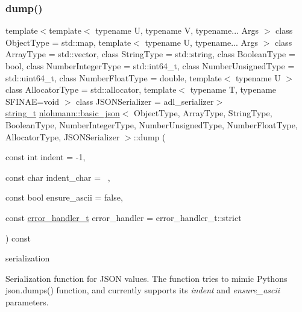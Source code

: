 \subsubsection{\texorpdfstring{dump()}{dump()}}
{\footnotesize\ttfamily template$<$template$<$ typename U, typename V, typename... Args $>$ class Object\+Type = std\+::map, template$<$ typename U, typename... Args $>$ class Array\+Type = std\+::vector, class String\+Type  = std\+::string, class Boolean\+Type  = bool, class Number\+Integer\+Type  = std\+::int64\+\_\+t, class Number\+Unsigned\+Type  = std\+::uint64\+\_\+t, class Number\+Float\+Type  = double, template$<$ typename U $>$ class Allocator\+Type = std\+::allocator, template$<$ typename T, typename S\+F\+I\+N\+A\+E=void $>$ class J\+S\+O\+N\+Serializer = adl\+\_\+serializer$>$ \\
\mbox{\hyperlink{classnlohmann_1_1basic__json_a61f8566a1a85a424c7266fb531dca005}{string\+\_\+t}} \mbox{\hyperlink{classnlohmann_1_1basic__json}{nlohmann\+::basic\+\_\+json}}$<$ Object\+Type, Array\+Type, String\+Type, Boolean\+Type, Number\+Integer\+Type, Number\+Unsigned\+Type, Number\+Float\+Type, Allocator\+Type, J\+S\+O\+N\+Serializer $>$\+::dump (\begin{DoxyParamCaption}\item[{const int}]{indent = {\ttfamily -\/1},  }\item[{const char}]{indent\+\_\+char = {\ttfamily \textquotesingle{}~\textquotesingle{}},  }\item[{const bool}]{ensure\+\_\+ascii = {\ttfamily false},  }\item[{const \mbox{\hyperlink{namespacenlohmann_1_1detail_a5a76b60b26dc8c47256a996d18d967df}{error\+\_\+handler\+\_\+t}}}]{error\+\_\+handler = {\ttfamily error\+\_\+handler\+\_\+t\+:\+:strict} }\end{DoxyParamCaption}) const\hspace{0.3cm}{\ttfamily [inline]}}



serialization 

Serialization function for J\+S\+ON values. The function tries to mimic Python\textquotesingle{}s {\ttfamily json.\+dumps()} function, and currently supports its {\itshape indent} and {\itshape ensure\+\_\+ascii} parameters.



